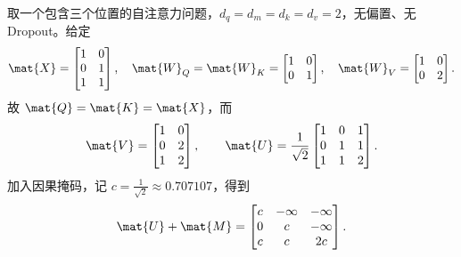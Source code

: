 \documentclass[../textbook.tex]{subfiles}
\begin{document}
\begin{example}[因果单头注意力的完整计算]
取一个包含三个位置的自注意力问题，$d_q=d_m=d_k=d_v=2$，无偏置、无 Dropout。给定
\begin{equation*}
 \mat{X}=\begin{bmatrix}1&0\\0&1\\1&1\end{bmatrix},\quad
 \mat{W}_Q=\mat{W}_K=\begin{bmatrix}1&0\\0&1\end{bmatrix},\quad
 \mat{W}_V=\begin{bmatrix}1&0\\0&2\end{bmatrix}.
\end{equation*}
故 $\mat{Q}=\mat{K}=\mat{X}$，而
\begin{equation*}
 \mat{V}=\begin{bmatrix}1&0\\0&2\\1&2\end{bmatrix},\qquad
 \mat{U}=\frac1{\sqrt2}\begin{bmatrix}1&0&1\\0&1&1\\1&1&2\end{bmatrix}.
\end{equation*}
加入因果掩码，记 $c=\frac{1}{\sqrt2}\approx0.707107$，得到
\begin{equation*}
 \mat{U}+\mat{M}=\begin{bmatrix}
 c&-\infty&-\infty\\
 0&c&-\infty\\
 c&c&2c
 \end{bmatrix}.
\end{equation*}


\end{example}
\end{document}
